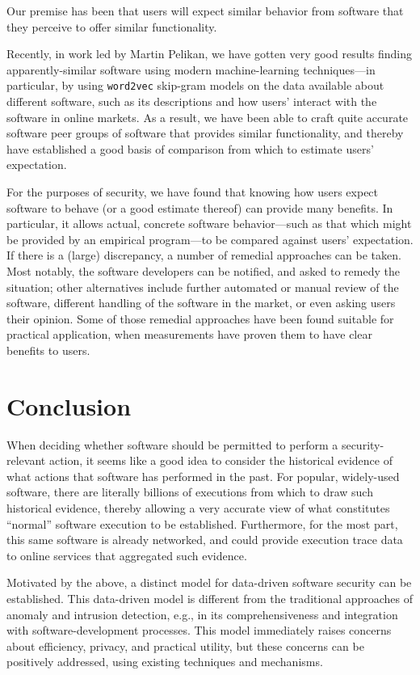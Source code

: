 \documentclass{IEEEtran}
\begin{document}
Our premise has been that users will expect 
similar behavior
from software that they perceive to offer similar functionality.


Recently,
in work led by Martin Pelikan,
we have gotten very good results 
finding apparently-similar software
using modern machine-learning techniques---in
particular, 
by using \texttt{word2vec} skip-gram models
on the data available about different software,
such as its descriptions and how users' interact with the software in online markets.
As a result,
we have been able to craft quite accurate software peer groups
of software that provides similar functionality,
and thereby have established
a good basis of comparison 
from which to estimate users' expectation.


For the purposes of security,
we have found that
knowing how users expect software to behave
(or a good estimate thereof)
can provide many benefits.
In particular,
it allows actual, concrete software behavior---such as
that which might be provided by an empirical program---to
be compared against users' expectation.
If there is a (large) discrepancy,
a number of remedial approaches can be taken.
Most notably, the software developers can be notified,
and asked to remedy the situation;
other alternatives
include 
further automated or manual review of the software,
different handling of the software in the market,
or even asking users their opinion.
Some of those remedial approaches 
have been found suitable for practical application,
when measurements have proven them to have clear benefits to users.


\section{Conclusion}
When deciding whether software should be permitted to perform a security-relevant action,
it seems like a good idea to consider the historical evidence
of what actions that software has performed in the past.
For popular, widely-used software,
there are literally billions of executions from which to draw such historical evidence,
thereby allowing a very accurate view of what constitutes ``normal'' software execution to be established.
Furthermore,
for the most part,
this same software is already networked, 
and could provide execution trace data to online services that aggregated such evidence.


Motivated by the above,
a distinct model for data-driven software security can be established.
This data-driven model is different from the traditional approaches of anomaly and intrusion detection,
e.g., in its comprehensiveness and integration with software-development processes.
This model 
immediately raises concerns about efficiency, privacy, and practical utility,
but these concerns
can be positively addressed,
using existing techniques and mechanisms.
\end{document}
